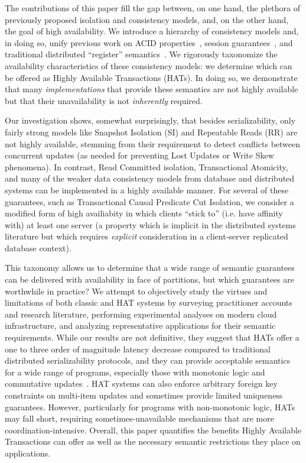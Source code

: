 The contributions of this paper fill the gap between, on one hand, the
plethora of previously proposed isolation and consistency models, and,
on the other hand, the goal of high availability. We introduce a
hierarchy of consistency models and, in doing so, unify previous work
on ACID properties~\cite{adya}, session
guarantees~\cite{sessionguarantees}, and traditional distributed
``register'' semantics~\cite{herlihy-art}. We rigorously taxonomize
the availability characteristics of these consistency models: we
determine which can be offered as Highly Available Transactions
(HATs). In doing so, we demonstrate that many \textit{implementations}
that provide these semantics are not highly available but that their
unavailability is not \textit{inherently} required.

Our investigation shows, somewhat surprisingly, that besides
serializability, only fairly strong models like Snapshot Isolation
(SI) and Repeatable Reads (RR) are not highly available, stemming from
their requirement to detect conflicts between concurrent updates (as
needed for preventing Lost Updates or Write Skew phenomena). In
contrast, Read Committed isolation, Transactional Atomicity, and many
of the weaker data consistency models from database and distributed
systems can be implemented in a highly available manner. For several
of these guarantees, such as Transactional Causal Predicate Cut
Isolation, we consider a modified form of high availiabity in which
clients ``stick to'' (i.e. have affinity with) at least one server (a
property which is implicit in the distributed systems literature but
which requires \textit{explicit} consideration in a client-server
replicated database context).

This taxonomy allows us to determine that a wide range of semantic
guarantees can be delivered with availability in face of partitions,
but which guarantees are worthwhile in practice? We attempt to
objectively study the virtues and limitations of both classic and HAT
systems by surveying practitioner accounts and research literature,
performing experimental analyses on modern cloud infrastructure, and
analyzing representative applications for their semantic
requirements. While our results are not definitive, they suggest that
HATs offer a one to three order of magnitude latency decrease compared
to traditional distributed serializability protocols, and they can
provide acceptable semantics for a wide range of programs, especially
those with monotonic logic and commutative updates~\cite{calm, blooml,
  crdt}. HAT systems can also enforce arbitrary foreign key
constraints on multi-item updates and sometimes provide limited
uniqueness guarantees. However, particularly for programs with
non-monotonic logic, HATs may fall short, requiring
sometimes-unavailable mechanisms that are more
coordination-intensive. Overall, this paper quantifies the benefits
Highly Available Transactions can offer as well as the necessary
semantic restrictions they place on applications.

